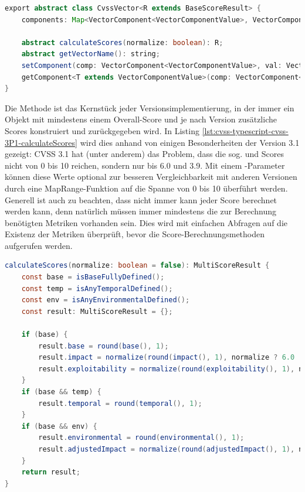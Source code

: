 \begin{lstlisting}[language=Java, label={lst:cvss-typescript-cvss-vector-class-attributes}, caption={Ausschnitt der CvssVector Klasse in TypeScript}, basicstyle=\scriptsize]
export abstract class CvssVector<R extends BaseScoreResult> {
    components: Map<VectorComponent<VectorComponentValue>, VectorComponentValue>;

    abstract calculateScores(normalize: boolean): R;
    abstract getVectorName(): string;
    setComponent(comp: VectorComponent<VectorComponentValue>, val: VectorComponentValue) { }
    getComponent<T extends VectorComponentValue>(comp: VectorComponent<T>): T { }
}
\end{lstlisting}

Die Methode  ist das Kernstück jeder Versionsimplementierung, in der immer ein Objekt mit mindestens einem Overall-Score und je nach Version zusätzliche Scores konstruiert und zurückgegeben wird.
In Listing \ref{lst:cvss-typescript-cvss-3P1-calculateScores} wird dies anhand von einigen Besonderheiten der Version 3.1 gezeigt:
CVSS 3.1 hat (unter anderem) das Problem, dass die sog.  und  Scores nicht von 0 bis 10 reichen, sondern nur bis 6.0 und 3.9.
Mit einem -Parameter können diese Werte optional zur besseren Vergleichbarkeit mit anderen Versionen durch eine MapRange-Funktion auf die Spanne von 0 bis 10 überführt werden.\newline
Generell ist auch zu beachten, dass nicht immer kann jeder Score berechnet werden kann, denn natürlich müssen immer mindestens die zur Berechnung benötigten Metriken vorhanden sein.
Dies wird mit einfachen Abfragen auf die Existenz der Metriken überprüft, bevor die Score-Berechnungsmethoden aufgerufen werden.

\begin{lstlisting}[language=Java, label={lst:cvss-typescript-cvss-3P1-calculateScores}, caption={CVSS 3.1 Score-Berechnung in TypeScript}, basicstyle=\scriptsize]
calculateScores(normalize: boolean = false): MultiScoreResult {
    const base = isBaseFullyDefined();
    const temp = isAnyTemporalDefined();
    const env = isAnyEnvironmentalDefined();
    const result: MultiScoreResult = {};

    if (base) {
        result.base = round(base(), 1);
        result.impact = normalize(round(impact(), 1), normalize ? 6.0 : 10);
        result.exploitability = normalize(round(exploitability(), 1), normalize ? 3.9 : 10);
    }
    if (base && temp) {
        result.temporal = round(temporal(), 1);
    }
    if (base && env) {
        result.environmental = round(environmental(), 1);
        result.adjustedImpact = normalize(round(adjustedImpact(), 1), normalize ? 6.1 : 10);
    }
    return result;
}
\end{lstlisting}

